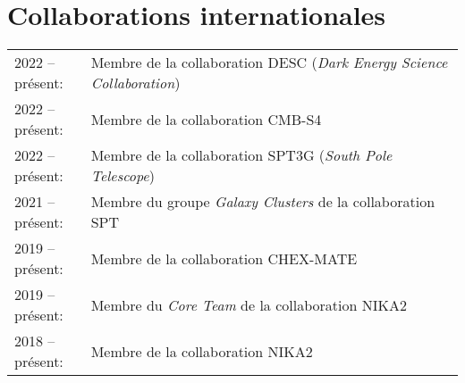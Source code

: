 \section{Collaborations internationales}


\begin{table}[H]
    {\def\arraystretch{1.}\tabcolsep=0pt
        \begin{tabular}{p{0.17\linewidth}p{0.84\linewidth}}

    2022 -- présent:
        & Membre de la collaboration DESC (\textit{Dark Energy Science Collaboration}) \\

    2022 -- présent:
        & Membre de la collaboration CMB-S4 \\

    2022 -- présent:
        & Membre de la collaboration SPT3G (\textit{South Pole Telescope}) \\

    2021 -- présent:
        & Membre du groupe \textit{Galaxy Clusters} de la collaboration SPT \\

    2019 -- présent:
        & Membre de la collaboration CHEX-MATE \\

    2019 -- présent:
        & Membre du \textit{Core Team} de la collaboration NIKA2 \\

    2018 -- présent:
        & Membre de la collaboration NIKA2

    \end{tabular}}
\end{table}
\vspace{-15pt}